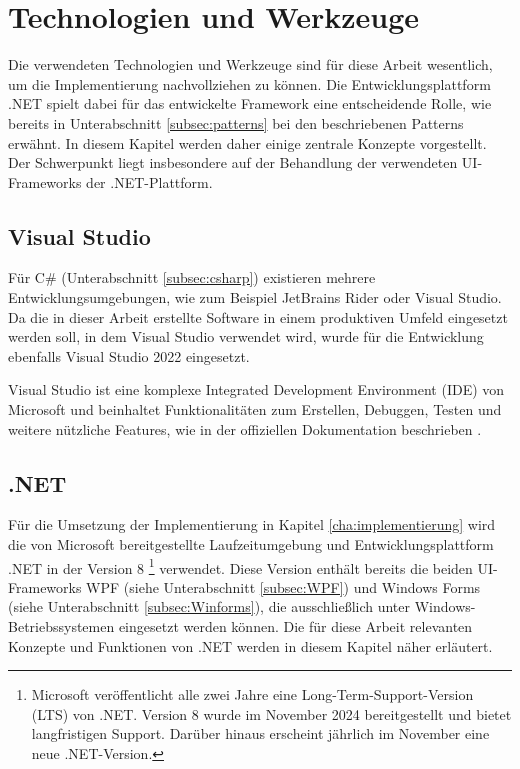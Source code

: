 \chapter{Technologien und Werkzeuge}
\label{cha:technologie_werkzeuge}
Die verwendeten Technologien und Werkzeuge sind für diese Arbeit wesentlich, um die Implementierung nachvollziehen zu können. Die Entwicklungsplattform .NET spielt dabei für das entwickelte Framework eine entscheidende Rolle, wie bereits in Unterabschnitt \ref{subsec:patterns} bei den beschriebenen Patterns erwähnt. In diesem Kapitel werden daher einige zentrale Konzepte vorgestellt. Der Schwerpunkt liegt insbesondere auf der Behandlung der verwendeten UI-Frameworks der .NET-Plattform.

\section{Visual Studio}
\label{sec:visual_studio}

Für C\# (Unterabschnitt \ref{subsec:csharp}) existieren mehrere Entwicklungsumgebungen, wie zum Beispiel JetBrains Rider oder Visual Studio. Da die in dieser Arbeit erstellte Software in einem produktiven Umfeld eingesetzt werden soll, in dem Visual Studio verwendet wird, wurde für die Entwicklung ebenfalls Visual Studio 2022 eingesetzt. 

Visual Studio ist eine komplexe Integrated Development Environment (IDE) von Microsoft und beinhaltet Funktionalitäten zum Erstellen, Debuggen, Testen und weitere nützliche Features, wie in der offiziellen Dokumentation beschrieben \cite{MicrosoftVisualStudioIDE2022}.

\section{.NET}
\label{sec:dotnet}
Für die Umsetzung der Implementierung in Kapitel \ref{cha:implementierung} wird die von Microsoft bereitgestellte Laufzeitumgebung und Entwicklungsplattform .NET \cite{dotnet} in der Version 8 \footnote{Microsoft veröffentlicht alle zwei Jahre eine Long-Term-Support-Version (LTS) von .NET. Version 8 wurde im November 2024 bereitgestellt und bietet langfristigen Support. Darüber hinaus erscheint jährlich im November eine neue .NET-Version.} verwendet. Diese Version enthält bereits die beiden UI-Frameworks WPF (siehe Unterabschnitt \ref{subsec:WPF}) und Windows Forms (siehe Unterabschnitt \ref{subsec:Winforms}), die ausschließlich unter Windows-Betriebssystemen eingesetzt werden können. Die für diese Arbeit relevanten Konzepte und Funktionen von .NET werden in diesem Kapitel näher erläutert.


